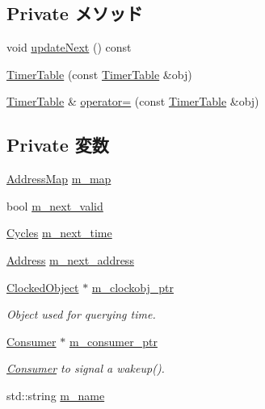 \subsection*{Private メソッド}
\begin{DoxyCompactItemize}
\item 
void \hyperlink{classTimerTable_a05f4fd90d099c5d73fa5132cc4c998fc}{updateNext} () const 
\item 
\hyperlink{classTimerTable_a9764098760fd28d90c29721b03c37840}{TimerTable} (const \hyperlink{classTimerTable}{TimerTable} \&obj)
\item 
\hyperlink{classTimerTable}{TimerTable} \& \hyperlink{classTimerTable_a569facea7e509f7f50d1ae82527db0d2}{operator=} (const \hyperlink{classTimerTable}{TimerTable} \&obj)
\end{DoxyCompactItemize}
\subsection*{Private 変数}
\begin{DoxyCompactItemize}
\item 
\hyperlink{classTimerTable_aafe31722aec34a121c4566b713a7a5e8}{AddressMap} \hyperlink{classTimerTable_a81aeb6fef4ddb55c4abc1662d977def1}{m\_\-map}
\item 
bool \hyperlink{classTimerTable_accdda4364ff7ccbe605fa69671ad24d1}{m\_\-next\_\-valid}
\item 
\hyperlink{classCycles}{Cycles} \hyperlink{classTimerTable_ab2e7bdd220d0b6072674d78ef9974963}{m\_\-next\_\-time}
\item 
\hyperlink{classAddress}{Address} \hyperlink{classTimerTable_af70be644429943a989c4c0776289059f}{m\_\-next\_\-address}
\item 
\hyperlink{classClockedObject}{ClockedObject} $\ast$ \hyperlink{classTimerTable_a7e1899f4b71f54a1b3d6813b09c78e48}{m\_\-clockobj\_\-ptr}
\begin{DoxyCompactList}\small\item\em Object used for querying time. \item\end{DoxyCompactList}\item 
\hyperlink{classConsumer}{Consumer} $\ast$ \hyperlink{classTimerTable_a83dd1dc8eef330b0c0d184a4167b26b4}{m\_\-consumer\_\-ptr}
\begin{DoxyCompactList}\small\item\em \hyperlink{classConsumer}{Consumer} to signal a wakeup(). \item\end{DoxyCompactList}\item 
std::string \hyperlink{classTimerTable_adb41893ba19e889e56c559f25fc1a68a}{m\_\-name}
\end{DoxyCompactItemize}


